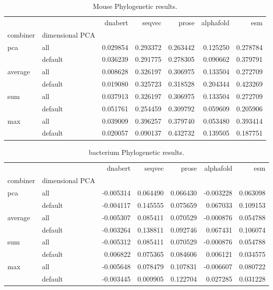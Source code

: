 \documentclass[12pt, letterpaper, twocolumn]{article}
\begin{document}
\begin{table*}[hbt]
\begin{tabular}{llrrrrr}
    \toprule
     &  & dnabert & seqvec & prose & alphafold & esm \\
    combiner & dimensional PCA &  &  &  &  &  \\
    \midrule
    \multirow[t]{2}{*}{pca} & all & 0.029854 & 0.293372 & 0.263442 & 0.125250 & 0.278784 \\
     & default & 0.036239 & 0.291775 & 0.278305 & 0.090662 & 0.379791 \\
    \cline{1-7}
    \multirow[t]{2}{*}{average} & all & 0.008628 & 0.326197 & 0.306975 & 0.133504 & 0.272709 \\
     & default & 0.019080 & 0.325723 & 0.318528 & 0.204344 & 0.423269 \\
    \cline{1-7}
    \multirow[t]{2}{*}{sum} & all & 0.037913 & 0.326197 & 0.306975 & 0.133504 & 0.272709 \\
     & default & 0.051761 & 0.254459 & 0.309792 & 0.059609 & 0.205906 \\
    \cline{1-7}
    \multirow[t]{2}{*}{max} & all & 0.039009 & 0.396257 & 0.379740 & 0.053480 & 0.393414 \\
     & default & 0.020057 & 0.090137 & 0.432732 & 0.139505 & 0.187751 \\
    \cline{1-7}
    \bottomrule
\end{tabular}
\caption{Mouse Phylogenetic results.}
\label{tab:mouse_phylo_results}
\end{table*}


\begin{table*}[hbt]
\begin{tabular}{llrrrrr}
    \toprule
     &  & dnabert & seqvec & prose & alphafold & esm \\
    combiner & dimensional PCA &  &  &  &  &  \\
    \midrule
    \multirow[t]{2}{*}{pca} & all & -0.005314 & 0.064490 & 0.066430 & -0.003228 & 0.063098 \\
     & default & -0.004117 & 0.145555 & 0.075659 & 0.067033 & 0.109153 \\
    \cline{1-7}
    \multirow[t]{2}{*}{average} & all & -0.005307 & 0.085411 & 0.070529 & -0.000876 & 0.054788 \\
     & default & -0.003264 & 0.138811 & 0.092746 & 0.067431 & 0.106074 \\
    \cline{1-7}
    \multirow[t]{2}{*}{sum} & all & -0.005312 & 0.085411 & 0.070529 & -0.000876 & 0.054788 \\
     & default & 0.006822 & 0.075365 & 0.084606 & 0.006121 & 0.034575 \\
    \cline{1-7}
    \multirow[t]{2}{*}{max} & all & -0.005648 & 0.078479 & 0.107831 & -0.006607 & 0.080722 \\
     & default & -0.003445 & 0.009905 & 0.122704 & 0.027285 & 0.031228 \\
    \cline{1-7}
    \bottomrule
    \end{tabular}
\caption{bacterium Phylogenetic results.}
\label{tab:bacterium_phylo_results}
\end{table*}
    
\end{document}
